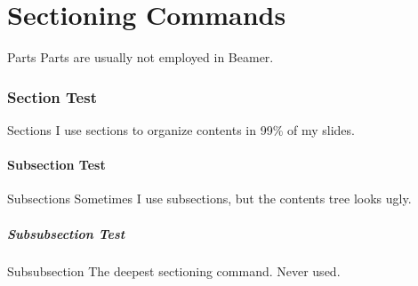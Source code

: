 

\part{Sectioning Commands}

\begin{frame}
\partpage
\end{frame}

\begin{frame}{\contentsname}
\tableofcontents
\end{frame}

\begin{frame}{Parts}
Parts are usually not employed in Beamer.
\end{frame}

\section{Section Test}

\begin{frame}
\sectionpage
\end{frame}

\begin{frame}{Sections}
I use sections to organize contents in 99\% of my slides.
\end{frame}

\subsection{Subsection Test}

\begin{frame}
\subsectionpage
\end{frame}

\begin{frame}{Subsections}
Sometimes I use subsections, but the contents tree looks ugly.
\end{frame}

\subsubsection{Subsubsection Test}

\begin{frame}{Subsubsection}
The deepest sectioning command. Never used.
\end{frame}
